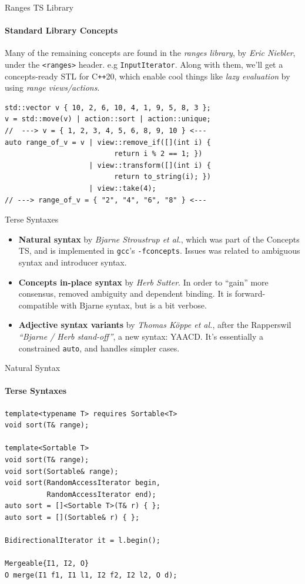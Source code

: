 \documentclass{beamer}
\begin{document}
    \begin{frame}[fragile]{Ranges TS Library}
        \framesubtitle{Standard Library Concepts}
        Many of the remaining concepts are found in the \emph{ranges library}, by \emph{Eric Niebler}, under the \texttt{<ranges>} header. e.g \texttt{InputIterator}. Along with them, we'll get a concepts-ready STL for C\texttt{++}20, which enable cool things like \emph{lazy evaluation} by using \emph{range views/actions}.
        \begin{center}
        \begin{lstlisting}[caption={example of the composability possibilities of range adaptors.}]
std::vector v { 10, 2, 6, 10, 4, 1, 9, 5, 8, 3 };
v = std::move(v) | action::sort | action::unique;
//  ---> v = { 1, 2, 3, 4, 5, 6, 8, 9, 10 } <--- 
auto range_of_v = v | view::remove_if([](int i) {
                          return i % 2 == 1; })
                    | view::transform([](int i) {
                          return to_string(i); })
                    | view::take(4);
// ---> range_of_v = { "2", "4", "6", "8" } <--- \end{lstlisting}
        \end{center}
    \end{frame}

    \begin{frame}[fragile]{Terse Syntaxes}
        \begin{itemize}
            \item{\textbf{Natural syntax} by \emph{Bjarne Stroustrup et al.}, which was part of the Concepts TS, and is implemented in \texttt{gcc}'s \texttt{-fconcepts}. Issues was related to ambiguous syntax and introducer syntax.}
            \item{\textbf{Concepts in-place syntax} by \emph{Herb Sutter}. In order to ``gain'' more consensus, removed ambiguity and dependent binding. It is forward-compatible with Bjarne syntax, but is a bit verbose.}
            \item{\textbf{Adjective syntax variants} by \emph{Thomas Köppe et al.}, after the Rapperswil \emph{``Bjarne / Herb stand-off''}, a new syntax: YAACD. It's essentially a constrained \texttt{auto}, and handles simpler cases.}
        \end{itemize}
    \end{frame}

    \begin{frame}[fragile]{Natural Syntax}
        \framesubtitle{Terse Syntaxes}
        \begin{center}
        \begin{lstlisting}
template<typename T> requires Sortable<T>
void sort(T& range);

template<Sortable T>
void sort(T& range);
void sort(Sortable& range);
void sort(RandomAccessIterator begin,
          RandomAccessIterator end);
auto sort = []<Sortable T>(T& r) { };
auto sort = [](Sortable& r) { };

BidirectionalIterator it = l.begin();

Mergeable{I1, I2, O}
O merge(I1 f1, I1 l1, I2 f2, I2 l2, O d); \end{lstlisting}
        \end{center}
    \end{frame}
\end{document}
